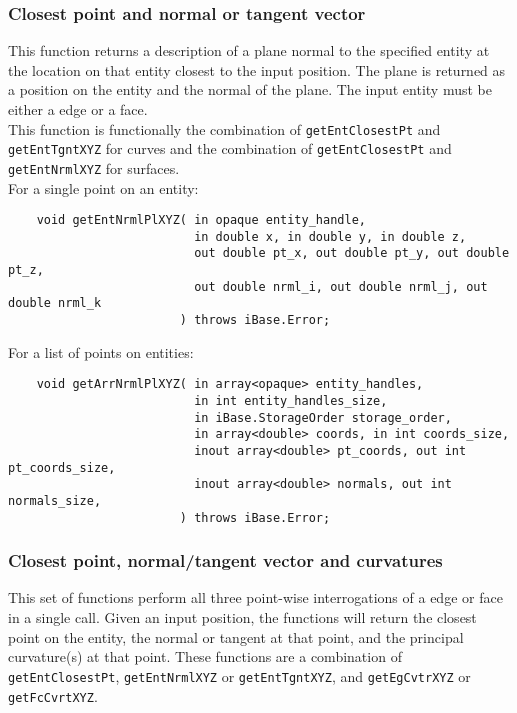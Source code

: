 \documentclass{article}
\begin{document}
\subsubsection{Closest point and normal or tangent vector}

This function returns a description of a plane normal to the specified
entity at the location on that entity closest to the input position.  The
plane is returned as a position on the entity and the normal of the plane.
The input entity must be either a edge or a face. \\

This function is functionally the combination of {\tt getEntClosestPt} and
{\tt getEntTgntXYZ} for curves and the combination of {\tt getEntClosestPt} and
{\tt getEntNrmlXYZ} for surfaces. \\

\hspace{-16pt}For a single point on an entity:
\begin{verbatim}
    void getEntNrmlPlXYZ( in opaque entity_handle, 
                          in double x, in double y, in double z,
                          out double pt_x, out double pt_y, out double pt_z,
                          out double nrml_i, out double nrml_j, out double nrml_k
                        ) throws iBase.Error;			
\end{verbatim}

\hspace{-16pt}For a list of points on entities:
\begin{verbatim}
    void getArrNrmlPlXYZ( in array<opaque> entity_handles,
                          in int entity_handles_size,
                          in iBase.StorageOrder storage_order,
                          in array<double> coords, in int coords_size,
                          inout array<double> pt_coords, out int pt_coords_size,
                          inout array<double> normals, out int normals_size,
                        ) throws iBase.Error;
\end{verbatim}

\subsubsection{Closest point, normal/tangent vector and curvatures}

This set of functions perform all three point-wise interrogations of a 
edge or face in a single call. Given an input position, the functions
will return the closest point on the entity, the normal or tangent at that
point, and the principal curvature(s) at that point.  These functions are 
a combination of {\tt getEntClosestPt}, {\tt getEntNrmlXYZ} or {\tt getEntTgntXYZ}, and 
{\tt getEgCvtrXYZ} or {\tt getFcCvrtXYZ}. \\
\end{document}
